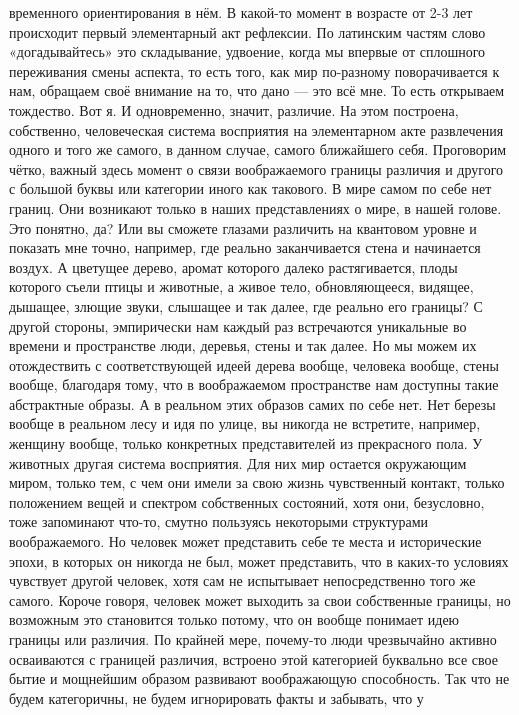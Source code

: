 временного ориентирования в нём. В какой-то момент в возрасте от 2-3 лет
происходит первый элементарный акт рефлексии. По латинским частям слово
«догадывайтесь» это складывание, удвоение, когда мы впервые от сплошного
переживания смены аспекта, то есть того, как мир по-разному поворачивается к
нам, обращаем своё внимание на то, что дано — это всё мне. То есть открываем
тождество. Вот я. И одновременно, значит, различие. На этом построена,
собственно, человеческая система восприятия на элементарном акте развлечения
одного и того же самого, в данном случае, самого ближайшего себя. Проговорим
чётко, важный здесь момент о связи воображаемого границы различия и другого с
большой буквы или категории иного как такового. В мире самом по себе нет границ.
Они возникают только в наших представлениях о мире, в нашей голове. Это понятно,
да? Или вы сможете глазами различить на квантовом уровне и показать мне точно,
например, где реально заканчивается стена и начинается воздух. А цветущее
дерево, аромат которого далеко растягивается, плоды которого съели птицы и
животные, а живое тело, обновляющееся, видящее, дышащее, злющие звуки, слышащее
и так далее, где реально его границы? С другой стороны, эмпирически нам каждый
раз встречаются уникальные во времени и пространстве люди, деревья, стены и так
далее. Но мы можем их отождествить с соответствующей идеей дерева вообще,
человека вообще, стены вообще, благодаря тому, что в воображаемом пространстве
нам доступны такие абстрактные образы. А в реальном этих образов самих по себе
нет. Нет березы вообще в реальном лесу и идя по улице, вы никогда не встретите,
например, женщину вообще, только конкретных представителей из прекрасного пола.
У животных другая система восприятия. Для них мир остается окружающим миром,
только тем, с чем они имели за свою жизнь чувственный контакт, только положением
вещей и спектром собственных состояний, хотя они, безусловно, тоже запоминают
что-то, смутно пользуясь некоторыми структурами воображаемого. Но человек может
представить себе те места и исторические эпохи, в которых он никогда не был,
может представить, что в каких-то условиях чувствует другой человек, хотя сам не
испытывает непосредственно того же самого. Короче говоря, человек может выходить
за свои собственные границы, но возможным это становится только потому, что он
вообще понимает идею границы или различия. По крайней мере, почему-то люди
чрезвычайно активно осваиваются с границей различия, встроено этой категорией
буквально все свое бытие и мощнейшим образом развивают воображающую способность.
Так что не будем категоричны, не будем игнорировать факты и забывать, что у
